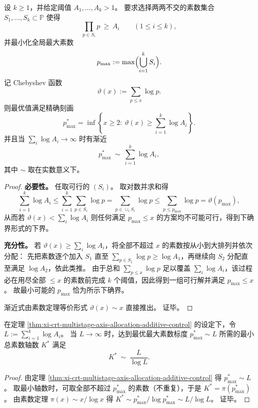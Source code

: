 
\begin{theorem}\label{thm:xi-crt-multistage-axis-allocation-additive-control}
设 \(k\ge 1\)，并给定阈值 \(A_1,\dots,A_k>1\)。
要求选择两两不交的素数集合 \(S_1,\dots,S_k\subset\mathbb P\) 使得
\[
\prod_{p\in S_i}p\ \ge\ A_i\qquad(1\le i\le k),
\]
并最小化全局最大素数
\[
p_{\max}:=\max\Bigl(\bigcup_{i=1}^k S_i\Bigr).
\]
记 Chebyshev 函数
\[
\vartheta(x):=\sum_{p\le x}\log p.
\]
则最优值满足精确刻画
\[
\boxed{\;
p_{\max}^\ast
=\inf\left\{x\ge 2:\ \vartheta(x)\ge \sum_{i=1}^k\log A_i\right\}. \;}
\]
并且当 \(\sum_i\log A_i\to\infty\) 时有渐近
\[
p_{\max}^\ast\ \sim\ \sum_{i=1}^k\log A_i,
\]
其中 \(\sim\) 取在实数意义下。
\end{theorem}
\begin{proof}
\textbf{必要性。}
任取可行的 \((S_i)\)。
取对数并求和得
\[
\sum_{i=1}^k\log A_i
\le
\sum_{i=1}^k\sum_{p\in S_i}\log p
=
\sum_{p\in\cup_i S_i}\log p
\le
\sum_{p\le p_{\max}}\log p
=\vartheta(p_{\max}),
\]
从而若 \(\vartheta(x)<\sum_i\log A_i\) 则任何满足 \(p_{\max}\le x\) 的方案均不可能可行，得到下确界形式的下界。
\par
\textbf{充分性。}
若 \(\vartheta(x)\ge \sum_i\log A_i\)，将全部不超过 \(x\) 的素数按从小到大排列并依次分配：
先把素数逐个加入 \(S_1\) 直至 \(\sum_{p\in S_1}\log p\ge \log A_1\)，再继续向 \(S_2\) 分配直至满足 \(\log A_2\)，依此类推。
由于总和 \(\sum_{p\le x}\log p\) 足以覆盖 \(\sum_i\log A_i\)，该过程必在用尽全部 \(\le x\) 的素数前完成 \(k\) 个阈值，因此得到一组可行解并满足 \(p_{\max}\le x\)。
故最小可能的 \(p_{\max}\) 恰为所示下确界。
\par
渐近式由素数定理等价形式 \(\vartheta(x)\sim x\) 直接推出。
证毕。
\end{proof}

\begin{corollary}\label{cor:xi-crt-multistage-axis-count-scaling}
在定理 \ref{thm:xi-crt-multistage-axis-allocation-additive-control} 的设定下，令
\(
L:=\sum_{i=1}^k\log A_i
\)。
当 \(L\to\infty\) 时，达到最优最大素数标度 \(p_{\max}^\ast\sim L\) 所需的最小总素数轴数 \(K^\ast\) 满足
\[
K^\ast\ \sim\ \frac{L}{\log L}.
\]
\end{corollary}
\begin{proof}
由定理 \ref{thm:xi-crt-multistage-axis-allocation-additive-control} 得 \(p_{\max}^\ast\sim L\)。
取最小轴数时，可取全部不超过 \(p_{\max}^\ast\) 的素数（不重复），于是 \(K^\ast=\pi(p_{\max}^\ast)\)。
由素数定理 \(\pi(x)\sim x/\log x\) 得
\(
K^\ast\sim p_{\max}^\ast/\log p_{\max}^\ast\sim L/\log L
\)。
证毕。
\end{proof}

\endinput
